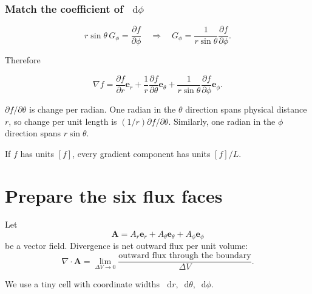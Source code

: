 \documentclass[11pt,a4paper]{article}
\newcommand{\er}{\bm e_r}
\newcommand{\etheta}{\bm e_\theta}
\newcommand{\ephi}{\bm e_\phi}
\newcommand{\dd}{\mathop{}\!\mathrm d}
\begin{document}
\subsubsection*{Match the coefficient of \(\dd\phi\)}

\[
  r\sin\theta\,G_\phi=\frac{\partial f}{\partial\phi}
  \quad\Longrightarrow\quad
  G_\phi=\frac{1}{r\sin\theta}\frac{\partial f}{\partial\phi}.
\]

Therefore
\begin{result}
\[
  \boxed{
  \nabla f
  =\frac{\partial f}{\partial r}\er
  +\frac{1}{r}\frac{\partial f}{\partial\theta}\etheta
  +\frac{1}{r\sin\theta}\frac{\partial f}{\partial\phi}\ephi.}
\]
\end{result}

\begin{idea}
\(\partial f/\partial\theta\) is change per radian. One radian in the \(\theta\) direction spans physical distance \(r\), so change per unit length is \((1/r)\partial f/\partial\theta\). Similarly, one radian in the \(\phi\) direction spans \(r\sin\theta\).
\end{idea}

If \(f\) has units \([f]\), every gradient component has units \([f]/L\).

\section{Prepare the six flux faces}

Let
\[
  \bm A=A_r\er+A_\theta\etheta+A_\phi\ephi
\]
be a vector field. Divergence is net outward flux per unit volume:
\[
  \nabla\cdot\bm A
  =\lim_{\Delta V\to0}
  \frac{\text{outward flux through the boundary}}{\Delta V}.
\]

We use a tiny cell with coordinate widths \(\dd r,\dd\theta,\dd\phi\).
\end{document}
